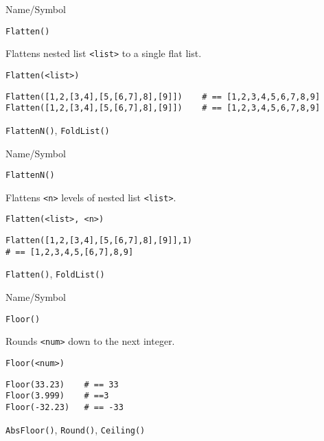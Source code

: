\rl



\begin{desc}{Name/Symbol}
\item[Name/Symbol]	\verb+Flatten()+

\item[Description]
	Flattens nested list \verb+<list>+ to a single flat list.

\item[Usage]
\begin{verbatim}
Flatten(<list>)
\end{verbatim}

\item[Example]
\begin{verbatim}
Flatten([1,2,[3,4],[5,[6,7],8],[9]])	# == [1,2,3,4,5,6,7,8,9]
Flatten([1,2,[3,4],[5,[6,7],8],[9]])	# == [1,2,3,4,5,6,7,8,9]
\end{verbatim}

\item[See Also]	\verb+FlattenN()+, \verb+FoldList()+
\end{desc}

\rl




\begin{desc}{Name/Symbol}
\item[Name/Symbol]	\verb+FlattenN()+

\item[Description]	Flattens \verb+<n>+ levels of nested list \verb+<list>+. 

\item[Usage]
\begin{verbatim}
Flatten(<list>, <n>)
\end{verbatim}

\item[Example]
\begin{verbatim}
Flatten([1,2,[3,4],[5,[6,7],8],[9]],1) 
# == [1,2,3,4,5,[6,7],8,9]
\end{verbatim}

\item[See Also]	\verb+Flatten()+, \verb+FoldList()+
\end{desc}

\rl




\begin{desc}{Name/Symbol}
\item[Name/Symbol]	\verb+Floor()+

\item[Description]	Rounds \verb+<num>+ down to the next integer.

\item[Usage]
\begin{verbatim}
Floor(<num>)
\end{verbatim}

\item[Example]
\begin{verbatim}
Floor(33.23)	# == 33
Floor(3.999)  	# ==3
Floor(-32.23) 	# == -33
\end{verbatim}
 
\item[See Also]	\verb+AbsFloor()+, \verb+Round()+, \verb+Ceiling()+
\end{desc}


